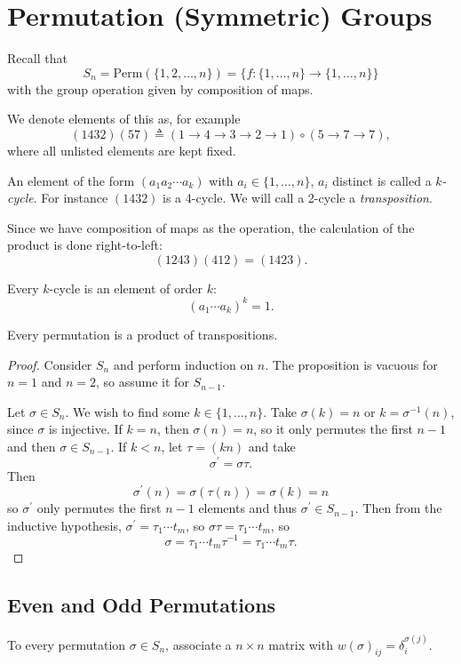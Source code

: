 \section{Permutation (Symmetric) Groups}
Recall that
$$
  S_n
= \mathrm{Perm}(\{1, 2, \dots, n\})
= \{ f : \{ 1, \dots, n \} \to \{ 1, \dots, n \} \}
$$
with the group operation given by composition of maps.

We denote elements of this as, for example
$$
  (1432)(57)
\triangleq
  (1 \to 4 \to 3 \to 2 \to 1) \circ (5 \to 7 \to 7),
$$
where all unlisted elements are kept fixed.

\begin{defn}
An element of the form $(a_1 a_2 \cdots a_k)$ with
$a_i \in \{ 1, \dots, n \}$, $a_i$ distinct is called a
\emph{$k$-cycle}.
For instance $(1432)$ is a 4-cycle. We will call a 2-cycle
a \emph{transposition}.
\end{defn}

Since we have composition of maps as the operation, the calculation of
the product is done right-to-left:
$$
(1243)(412) = (1423).
$$

\begin{remark}
Every $k$-cycle is an element of order $k$:
$$
(a_1 \cdots a_k)^k = 1.
$$
\end{remark}

\begin{prop}
Every permutation is a product of transpositions.
\end{prop}
\begin{proof}
Consider $S_n$ and perform induction on $n$. The proposition is
vacuous for $n = 1$ and $n = 2$, so assume it for $S_{n-1}$.

Let $\sigma \in S_n$. We wish to find some $k \in \{1, \dots, n\}$.
Take $\sigma(k) = n$ or $k = \sigma^{-1}(n)$, since $\sigma$ is
injective. If $k = n$, then $\sigma(n) = n$, so it only permutes the
first $n-1$ and then
$\sigma \in S_{n-1}$. If $k < n$, let $\tau = (kn)$ and take
$$
\sigma^\prime = \sigma \tau.
$$
Then
$$
  \sigma^\prime(n)
= \sigma (\tau(n))
= \sigma(k)
= n
$$
so
$\sigma^\prime$ only permutes the first $n-1$ elements and thus
$\sigma^\prime \in S_{n-1}$. Then from the inductive hypothesis,
$\sigma^\prime = \tau_1 \cdots t_m$,
so $\sigma \tau = \tau_1 \cdots t_m$,
so
$$
\sigma
= \tau_1 \cdots t_m \tau^{-1}
= \tau_1 \cdots t_m \tau.
$$
\end{proof}

\subsection*{Even and Odd Permutations}
To every permutation $\sigma \in S_n$, associate a $n \times n$ matrix
with $w(\sigma)_{ij} = \delta_i^{\sigma(j)}$.

